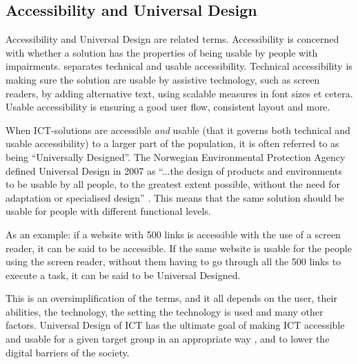 \subsection{Accessibility and Universal Design}
Accessibility and Universal Design are related terms. Accessibility is concerned with whether a solution has the properties of being usable by people with impairments. \textcite{paddison_applying_2003} separates technical and usable accessibility. Technical accessibility is making sure the solution are usable by assistive technology, such as screen readers, by adding alternative text, using scalable measures in font sizes et cetera. Usable accessibility is ensuring a good user flow, consistent layout and more.

When ICT-solutions are accessible \textit{and} usable (that it governs both technical and usable accessibility) to a larger part of the population, it is often referred to as being “Universally Designed”. The Norwegian Environmental Protection Agency defined Universal Design in 2007 as “...the design of products and environments to be usable by all people, to the greatest extent possible, without the need for adaptation or specialised design” \parencite{miljoverndepartementet_t-1468_2007}. This means that the same solution should be usable for people with different functional levels. 

As an example: if a website with 500 links is accessible with the use of a screen reader, it can be said to be accessible. If the same website is usable for the people using the screen reader, without them having to go through all the 500 links to execute a task, it can be said to be Universal Designed. 

This is an oversimplification of the terms, and it all depends on the user, their abilities, the technology, the setting the technology is used and many other factors. Universal Design of ICT has the ultimate goal of making ICT accessible and usable for a given target group in an appropriate way \parencite{tollefsen_web_2013}, and to lower the digital barriers of the society. 



